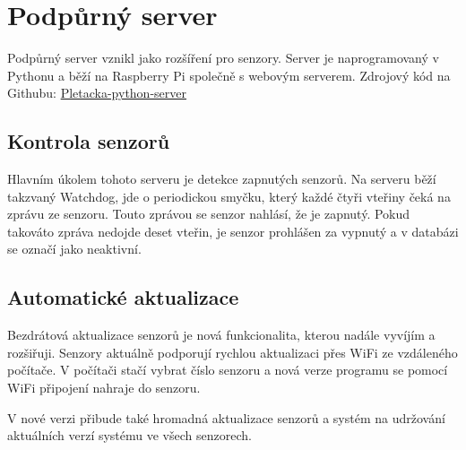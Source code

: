 \chapter{Podpůrný server}
Podpůrný server vznikl jako rozšíření pro senzory.
Server je naprogramovaný v Pythonu a běží na Raspberry Pi společně s webovým serverem.\newline
Zdrojový kód na Githubu: \href{https://github.com/Pletacka-IoT/Pletacka-python-server}{Pletacka-python-server}\cite{PL_PY}


\section{Kontrola senzorů}
Hlavním úkolem tohoto serveru je detekce zapnutých senzorů.
Na serveru běží takzvaný Watchdog, jde o periodickou smyčku, který každé čtyři vteřiny čeká na zprávu ze senzoru.
Touto zprávou se senzor nahlásí, že je zapnutý. Pokud takováto zpráva nedojde deset vteřin, je senzor prohlášen za vypnutý a v databázi se označí jako neaktivní.


\section{Automatické aktualizace}
Bezdrátová aktualizace senzorů je nová funkcionalita, kterou nadále vyvíjím a rozšiřuji.
Senzory aktuálně podporují rychlou aktualizaci přes WiFi ze vzdáleného počítače.
V počítači stačí vybrat číslo senzoru a nová verze programu se pomocí WiFi připojení nahraje do senzoru.

V nové verzi přibude také hromadná aktualizace senzorů a systém na udržování aktuálních verzí systému ve všech senzorech.




\newpage